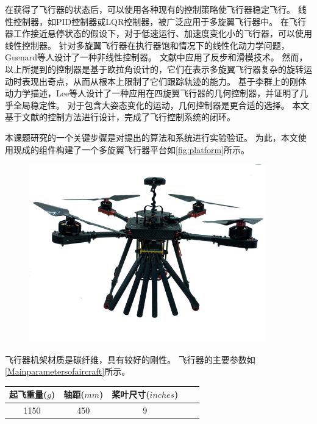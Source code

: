 \documentclass[
  type=master
]{gdutthesis}
\begin{document}
在获得了飞行器的状态后，可以使用各种现有的控制策略使飞行器稳定飞行。
线性控制器，如PID控制器或LQR控制器，被广泛应用于多旋翼飞行器中\cite{mechali2022fixed,elkhatem2022robust}。
在飞行器工作接近悬停状态的假设下，对于低速运行、加速度变化小的飞行器，可以使用线性控制器。
针对多旋翼飞行器在执行器饱和情况下的线性化动力学问题，Guenard等人设计了一种非线性控制器\cite{guenard2005dynamic}。
文献\parencite{bouabdallah2005backstepping}中应用了反步和滑模技术。
然而，以上所提到的控制器是基于欧拉角设计的，它们在表示多旋翼飞行器复杂的旋转运动时表现出奇点，从而从根本上限制了它们跟踪轨迹的能力。
基于李群上的刚体动力学描述，Lee等人设计了一种应用在四旋翼飞行器的几何控制器，并证明了几乎全局稳定性\parencite{lee2010geometric}。
对于包含大姿态变化的运动，几何控制器是更合适的选择。
本文基于文献\parencite{lee2010geometric}的控制方法进行设计，完成了飞行控制系统的闭环。

本课题研究的一个关键步骤是对提出的算法和系统进行实验验证。
为此，本文使用现成的组件构建了一个多旋翼飞行器平台如\autoref{fig:platform}所示。
\begin{figure}[H]
	\centering
	\includegraphics[width=0.92\textwidth]{platform.png}
	\label{fig:platform}
\end{figure} 

飞行器机架材质是碳纤维，具有较好的刚性。
飞行器的主要参数如\autoref{Mainparametersofaircraft}所示。
\begin{table}[h]
	\label{Mainparametersofaircraft}
	\begin{tabular}{ccccc}
		\toprule
		起飞重量($g$) & 轴距($mm$) & 桨叶尺寸($inches$)\\
		\midrule
		1150 & 450 & 9 \\ 
		\bottomrule 
	\end{tabular}
\end{table}
\end{document}
